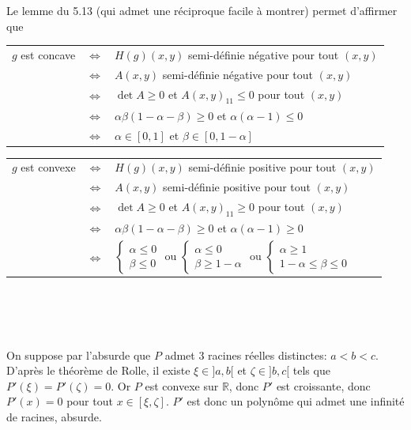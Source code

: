 \documentclass{report}
\begin{document}
Le lemme du 5.13 (qui admet une réciproque facile à montrer) permet d'affirmer que \newline
\setlength{\tabcolsep}{0.1em}
\begin{tabular}{ccl}
$g$ est concave & $\iff$ & $H(g)(x,y)$ semi-définie négative pour tout $(x,y)$\\
& $\iff$ & $A(x,y)$ semi-définie négative pour tout $(x,y)$ \\
& $\iff$ & $\det A\geq 0$ et $A(x,y)_{11} \leq 0$ pour tout $(x,y)$ \\
& $\iff$ & $\alpha \beta (1-\alpha -\beta)\geq 0 $ et $\alpha (\alpha-1)\leq 0$ \\
& $\iff$ & $\alpha \in [0,1]$ et $\beta\in [0,1-\alpha]$
\end{tabular}\newline
\newline
\newline
\setlength{\tabcolsep}{0.1em}
\begin{tabular}{ccl}
$g$ est convexe & $\iff$ & $H(g)(x,y)$ semi-définie positive pour tout $(x,y)$\\
& $\iff$ & $A(x,y)$ semi-définie positive pour tout $(x,y)$ \\
& $\iff$ & $\det A\geq 0$ et $A(x,y)_{11} \geq 0$ pour tout $(x,y)$ \\
& $\iff$ & $\alpha \beta (1-\alpha -\beta)\geq 0 $ et $\alpha (\alpha-1)\geq 0$ \\
& $\iff$ & $\begin{cases} \alpha\leq 0 \\ \beta \leq 0 \end{cases}$ ou \; $\begin{cases} \alpha\leq 0 \\ \beta \geq 1-\alpha \end{cases}$ ou \; $\begin{cases} \alpha\geq 1 \\ 1-\alpha \leq \beta \leq 0 \end{cases}$
\end{tabular}\newline



\subsection{} \noindent{}\\ 
\\ 
\\
\noindent On suppose par l'absurde que $P$ admet $3$ racines réelles distinctes: $a<b<c$. D'après le théorème de Rolle, il existe $\xi\in ]a,b[$ et $\zeta \in ]b,c[$ tels que $P'(\xi) = P'(\zeta)=0$. Or $P$ est convexe sur $\mathbb R$, donc $P'$ est croissante, donc $P'(x)=0$ pour tout $x\in [\xi,\zeta]$. $P'$ est donc un polynôme qui admet une infinité de racines, absurde.
\end{document}
